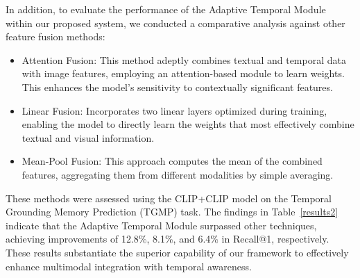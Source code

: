 
\begin{table}[t]

\vspace{-2mm}
\caption{\label{results2}
Comparison of Adaptive Temporal Module (ATM) with other methods of feature integration on Temporal Grounding Memory Prediction task.
}
\vspace{-3mm}
\end{table}


In addition, to evaluate the performance of the Adaptive Temporal Module within our proposed system, we conducted a comparative analysis against other feature fusion methods:
\begin{itemize}
 \vspace{-2mm}
    \item Attention Fusion: This method adeptly combines textual and temporal data with image features, employing an attention-based module to learn weights. This enhances the model's sensitivity to contextually significant features.
 \vspace{-2mm}   
    \item Linear Fusion: Incorporates two linear layers optimized during training, enabling the model to directly learn the weights that most effectively combine textual and visual information.
 \vspace{-6mm} 
    \item Mean-Pool Fusion: This approach computes the mean of the combined features, aggregating them from different modalities by simple averaging.

\end{itemize}

These methods were assessed using the CLIP+CLIP model on the Temporal Grounding Memory Prediction (TGMP) task. The findings in Table~\ref{results2} indicate that the Adaptive Temporal Module surpassed other techniques, achieving improvements of 12.8\%, 8.1\%, and 6.4\% in Recall@1, respectively. These results substantiate the superior capability of our framework to effectively enhance multimodal integration with temporal awareness.


